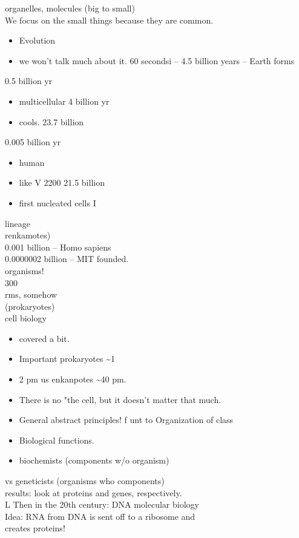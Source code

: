 \documentclass{article}
\begin{document}
organelles, molecules (big to small)\\
We focus on the small things because they are common.\\
\begin{itemize}\item  Evolution \item  we won't talk much about it. 60 secondsi
– 4.5 billion years – Earth forms
\end{itemize}
0.5 billion yr \begin{itemize}\item  multicellular
4 billion yr \item  cools.
23.7 billion
\end{itemize}
0.005 billion yr \begin{itemize}\item  human\item like
V 2200 21.5 billion \item  first nucleated cells I
\end{itemize}
lineage\\
renkamotes)\\
0.001 billion – Homo sapiens\\
0.0000002 billion – MIT founded.\\
organisms!\\
300\\
rms, somehow\\
(prokaryotes)\\
cell biology \begin{itemize}\item  covered a bit.
\item  Important prokaryotes \textasciitilde1\item 2 pm us enkanpotes \textasciitilde40 pm.
\item  There is no "the cell, but it doesn't matter that much.
\item  General abstract principles! f unt to
Organization of class
\item  Biological functions. \item  biochemists (components w/o organism)
\end{itemize}
vs geneticists (organisms who components)\\
results: look at proteins and genes, respectively.\\
L Then in the 20th century: DNA molecular biology\\
Idea: RNA from DNA is sent off to a ribosome and\\
creates proteins!\\
\end{document}
